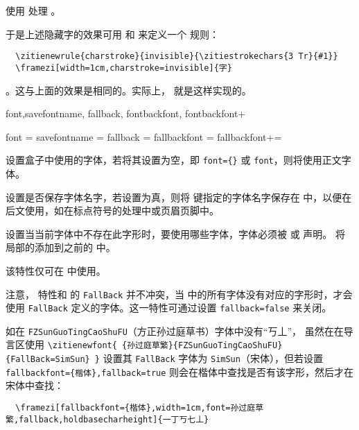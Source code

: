 \documentclass{ctxdoc}
\begin{document}
 使用  处理 。
  
于是上述隐藏字的效果可用  和  来定义一个  规则：
\begin{verbatim}
  \zitienewrule{charstroke}{invisible}{\zitiestrokechars{3 Tr}{#1}}
  \framezi[width=1cm,charstroke=invisible]{字}
\end{verbatim}
  。这与上面的效果是相同的。实际上， 就是这样实现的。

\begin{function}{
  font,savefontname,
  fallback,
  fontbackfont,
  fontbackfont+
}
  \begin{syntax}
    font =  
    savefontname = \TTF {}
    fallback = \TTF {}
    fallbackfont = 
    fallbackfont+= 
  \end{syntax}
   设置盒子中使用的字体，若将其设置为空，即 \verb|font={}| 或 \verb|font|，则将使用正文字体。

   设置是否保存字体名字，若设置为真，则将  键指定的字体名字保存在  中，以便在后文使用，如在标点符号的处理中或页眉页脚中。

   设置当当前字体中不存在此字形时，要使用哪些字体，字体必须被  或  声明。
   将  局部的添加到之前的  中。

  该特性仅可在 \XeTeX{} 中使用。

  注意， 特性和  的 \verb|FallBack| 并不冲突，当  中的所有字体没有对应的字形时，才会使用 \verb|FallBack| 定义的字体。这一特性可通过设置 \verb|fallback=false| 来关闭。
\end{function}

如在 \verb|FZSunGuoTingCaoShuFU|（方正孙过庭草书）字体中没有“丂丄”，
虽然在在导言区使用 \verb|\zitienewfont{ {孙过庭草繁}{FZSunGuoTingCaoShuFU}{FallBack=SimSun} }| 设置其 \verb|FallBack| 字体为 \verb|SimSun|（宋体），但若设置 \verb|fallbackfont={楷体},fallback=true| 则会在楷体中查找是否有该字形，然后才在宋体中查找：

\begin{verbatim}
  \framezi[fallbackfont={楷体},width=1cm,font=孙过庭草繁,fallback,holdbasecharheight]{一丁丂七丄}
\end{verbatim}
\end{document}
